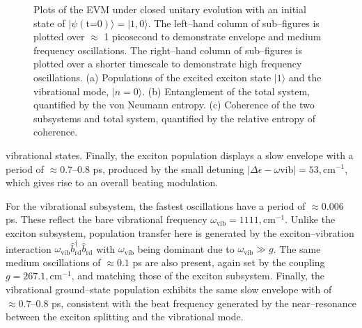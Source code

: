 \documentclass[11pt]{article}
\begin{document}
\begin{figure}[H]
    \caption{Plots of the EVM under closed unitary evolution with an initial state of $|\psi (\text{t=0})\rangle = |1, 0\rangle$. The left--hand column of sub--figures is plotted over $\approx$ 1 picosecond to demonstrate envelope and medium frequency oscillations. The right--hand column of sub--figures is plotted over a shorter timescale to demonstrate high frequency oscillations. (a) Populations of the excited exciton state $|1\rangle$ and the vibrational mode, $|n=0\rangle$. (b) Entanglement of the total system, quantified by the von Neumann entropy. (c) Coherence of the two subsystems and total system, quantified by the relative entropy of coherence.} 
    \label{fig:EVM_CQS_e0}
\end{figure}

\noindent vibrational states. Finally, the exciton population displays a slow envelope with a period of $\approx0.7$–$0.8$ ps, produced by the small detuning $|\Delta\epsilon - \omega{\scriptscriptstyle \text{vib}}| = 53,\text{cm}^{-1}$, which gives rise to an overall beating modulation.

For the vibrational subsystem, the fastest oscillations have a period of $\approx0.006$ ps. These reflect the bare vibrational frequency $\omega_{\scriptscriptstyle \text{vib}} = 1111,\text{cm}^{-1}$. Unlike the exciton subsystem, population transfer here is generated by the exciton--vibration interaction $\omega_{\scriptscriptstyle \text{vib}} \hat{b}_{\scriptscriptstyle \text{rd}}^\dagger \hat{b}_{\scriptscriptstyle \text{rd}}$ with $\omega_{\scriptscriptstyle \text{vib}}$ being dominant due to $\omega_{\scriptscriptstyle \text{vib}}\gg g$. The same medium oscillations of $\approx0.1$ ps are also present, again set by the coupling $g = 267.1,\text{cm}^{-1}$, and matching those of the exciton subsystem. Finally, the vibrational ground–state population exhibits the same slow envelope with of $\approx0.7$–$0.8$ ps, consistent with the beat frequency generated by the near--resonance between the exciton splitting and the vibrational mode.
\end{document}
